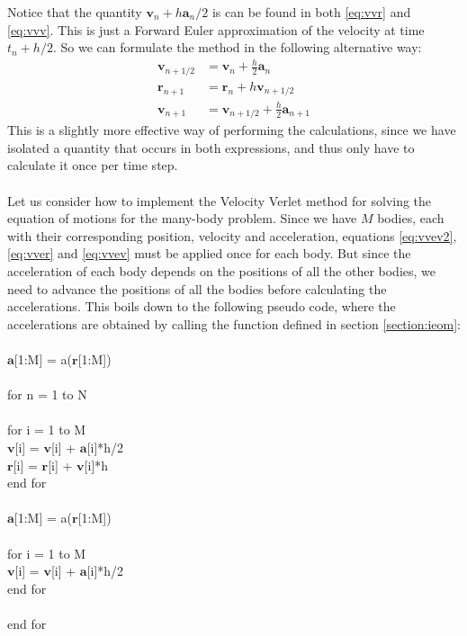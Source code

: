 \documentclass{article}
\newcommand{\mb}[1]{\mathbf{#1}}
\newenvironment{codefont}{\ttfamily}{\par}
\begin{document}
Notice that the quantity $\mb{v}_n + h\mb{a}_n/2$ is can be found in both \eqref{eq:vvr} and \eqref{eq:vvv}. This is just a Forward Euler approximation of the velocity at time $t_n + h/2$. So we can formulate the method in the following alternative way:
\begin{align}
    \mb{v}_{n+1/2} &= \mb{v}_n + \frac{h}{2}\mb{a}_n \label{eq:vvev2} \\
    \mb{r}_{n+1} &= \mb{r}_n + h\mb{v}_{n+1/2} \label{eq:vver} \\
    \mb{v}_{n+1} &= \mb{v}_{n+1/2} + \frac{h}{2}\mb{a}_{n+1} \label{eq:vvev}
\end{align}
This is a slightly more effective way of performing the calculations, since we have isolated a quantity that occurs in both expressions, and thus only have to calculate it once per time step. \\\\
Let us consider how to implement the Velocity Verlet method for solving the equation of motions for the many-body problem. Since we have $M$ bodies, each with their corresponding position, velocity and acceleration, equations \eqref{eq:vvev2}, \eqref{eq:vver} and \eqref{eq:vvev} must be applied once for each body. But since the acceleration of each body depends on the positions of all the other bodies, we need to advance the positions of all the bodies before calculating the accelerations. This boils down to the following pseudo code, where the accelerations are obtained by calling the function defined in section \ref{section:ieom}: \\\\
\begin{codefont}
$\mb{a}$[1:M] = a($\mb{r}$[1:M]) \\\\
for n = 1 to N \\\\
    \indent for i = 1 to M \\
    \indent\indent  $\mb{v}$[i] = $\mb{v}$[i] + $\mb{a}$[i]*h/2 \\
    \indent\indent $\mb{r}$[i] = $\mb{r}$[i] + $\mb{v}$[i]*h \\
    \indent end for \\\\
    \indent $\mb{a}$[1:M] = a($\mb{r}$[1:M]) \\\\
    \indent for i = 1 to M \\
    \indent\indent  $\mb{v}$[i] = $\mb{v}$[i] + $\mb{a}$[i]*h/2 \\
    \indent end for \\\\
end for \\
\end{codefont}
\end{document}
